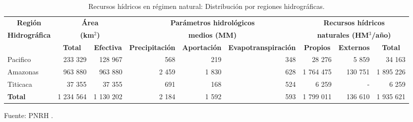 
\begin{sidewaystable}
\caption{Recursos hídricos en régimen natural: Distribución por regiones hidrográficas.}
\label{tab:RH_dist}
\centering
\begin{tabular}{lrrrrrrrr}
\hline
\multicolumn{1}{c}{\textbf{Región}}       & \multicolumn{2}{c}{\textbf{Área}}                                          & \multicolumn{3}{c}{\textbf{Parámetros hidrológicos}}                                                                   & \multicolumn{3}{c}{\textbf{Recursos hídricos}}                                                                    \\
\multicolumn{1}{c}{\textbf{Hidrográfica}} & \multicolumn{2}{c}{\textbf{(km$^2$)}}                                         & \multicolumn{3}{c}{\textbf{medios (MM)}}                                                                               & \multicolumn{3}{c}{\textbf{naturales (HM$^3$/año)}}                                                                   \\ \hline
\multicolumn{1}{c}{\textbf{}}             & \multicolumn{1}{c}{\textbf{Total}} & \multicolumn{1}{c}{\textbf{Efectiva}} & \multicolumn{1}{c}{\textbf{Precipitación}} & \multicolumn{1}{c}{\textbf{Aportación}} & \multicolumn{1}{c}{\textbf{Evapotranspiración}} & \multicolumn{1}{c}{\textbf{Propios}} & \multicolumn{1}{c}{\textbf{Externos}} & \multicolumn{1}{c}{\textbf{Total}} \\ \hline
Pacifico                                  & 233 329                            & 128 967                               & 568                                        & 219                                     & 348                             & 28 276                               & 5 859                                 & 34 163                             \\
Amazonas                                  & 963 880                            & 963 880                               & 2 459                                      & 1 830                                   & 628                             & 1 764 475                            & 130 751                               & 1 895 226                          \\
Titicaca                                  & 37 355                             & 37 355                                & 691                                        & 168                                     & 524                             & 6 259                                & -                                     & 6 259                              \\ \hline
\textbf{Total}                            & 1 234 564                          & 1 130 202                             & 2 184                                      & 1 592                                   & 593                             & 1 799 011                            & 136 610                               & 1 935 621                          \\ \hline
\end{tabular}
{\raggedright Fuente: PNRH \citep{PNRH2013}. \par}
\end{sidewaystable}

